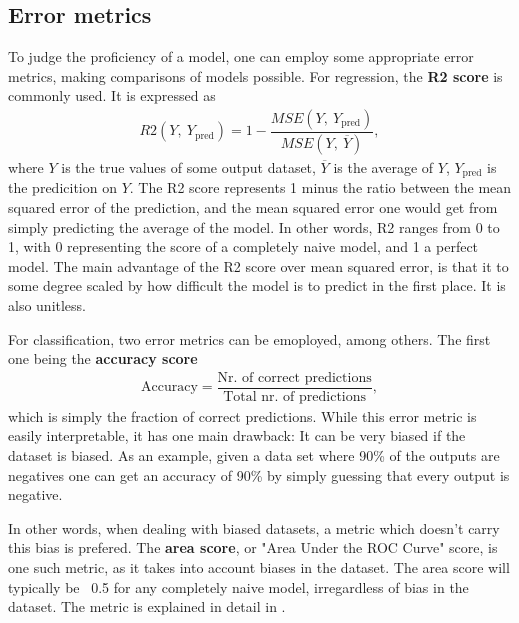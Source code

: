 \documentclass[10pt, twocolumn]{article}
\begin{document}
\subsection{Error metrics}
\label{subsec:Method/Error_metrics}
To judge the proficiency of a model, one can employ some appropriate error metrics, making comparisons of models possible. For regression, the \textbf{R2 score} is commonly used. It is expressed as 
\begin{align}
    R2(Y,\ Y_\text{pred}) = 1 - \dfrac{MSE(Y,\ Y_\text{pred})}{MSE(Y,\ \overline{Y})}, 
\end{align}
where $Y$ is the true values of some output dataset, $\overline{Y}$ is the average of $Y$, $Y_\text{pred}$ is the predicition on $Y$. The R2 score represents 1 minus the ratio between the mean squared error of the prediction, and the mean squared error one would get from simply predicting the average of the model. In other words, R2 ranges from 0 to 1, with 0 representing the score of a completely naive model, and 1 a perfect model. The main advantage of the R2 score over mean squared error, is that it to some degree scaled by how difficult the model is to predict in the first place. It is also unitless.

For classification, two error metrics can be emoployed, among others. The first one being the \textbf{accuracy score}
\begin{align}
    \text{Accuracy} = \dfrac{\text{Nr. of correct predictions}}{\text{Total nr. of predictions}},
\end{align}
which is simply the fraction of correct predictions. While this error metric is easily interpretable, it has one main drawback: It can be very biased if the dataset is biased. As an example, given a data set where 90\% of the outputs are negatives one can get an accuracy of 90\% by simply guessing that every output is negative.

In other words, when dealing with biased datasets, a metric which doesn't carry this bias is prefered. The \textbf{area score}, or "Area Under the ROC Curve" score, is one such metric, as it takes into account biases in the dataset. The area score will typically be ~0.5 for any completely naive model, irregardless of bias in the dataset. The metric is explained in detail in \cite{TowardsDataScienceMetrics}.




\end{document}
